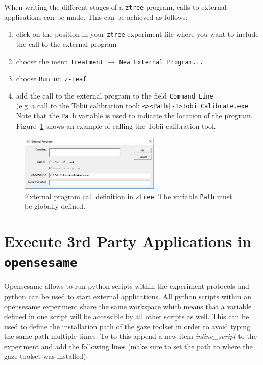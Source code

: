 \documentclass[a4paper,oneside]{book}
\begin{document}
When writing the different stages of a \texttt{ztree} program, calls to external applications can be made.
This can be achieved as follows:
\begin{enumerate}
    \item click on the position in your \texttt{ztree} experiment file where you want to include the call to the external program
    \item choose the menu \texttt{Treatment} $\rightarrow$ \texttt{New External Program...}
    \item choose \texttt{Run on z-Leaf}
    \item add the call to the external program to the field \texttt{Command Line} \\
        (e.g~a call to the Tobii calibration tool: \texttt{<><Path|-1>TobiiCalibrate.exe}\\
        Note that the \texttt{Path} variable is used to indicate the location of the program.
        Figure~\ref{fig.extcall} shows an example of calling the Tobii calibration tool.
\end{enumerate}
\begin{figure}[ht]
    \centering
    \includegraphics[width=0.6\textwidth]{ztree_extcall.png}
    \caption{External program call definition in \texttt{ztree}. The variable \texttt{Path} must be globally defined.}
    \label{fig.extcall}
\end{figure}

\section{Execute 3rd Party Applications in \texttt{opensesame}}
\label{sec.external.opensesame}

Opensesame allows to run python scripts within the experiment protocols and python can be used to start external applications.
All python scripts within an opensesame experiment share the same workspace which means that a variable defined in one script will be accessible by all other scripts as well.
This can be used to define the installation path of the gaze toolset in order to avoid typing the same path multiple times.
To to this append a new item \emph{inline\_script} to the experiment and add the following lines (make sure to set the path to where the gaze toolset was installed):
\end{document}

